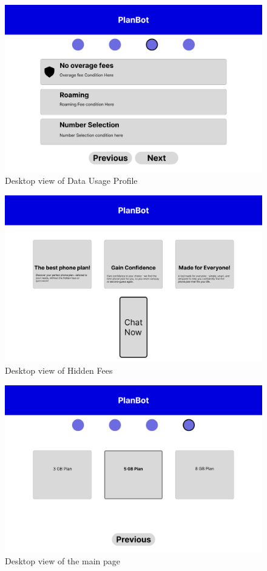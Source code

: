 \documentclass[conference]{IEEEtran}
\begin{document}
\begin{figure}[H]
    \centering
    \includegraphics[width=1\linewidth]{Desktop/Hidden Fees - DesktopDESKTOP.png}
    \caption{Desktop view of Data Usage Profile}
    \label{fig:user flow}
\end{figure}
\begin{figure}[H]
    \centering
    \includegraphics[width=1\linewidth]{Desktop/Home Page - DesktopDESKTOP.png}
    \caption{Desktop view of Hidden Fees}
    \label{fig:user flow}
\end{figure}
\begin{figure}[H]
    \centering
    \includegraphics[width=1\linewidth]{Desktop/Summary and Compare - DesktopDESKTOP.png}
    \caption{Desktop view of the main page}
    \label{fig:user flow}
\end{figure}
\end{document}
